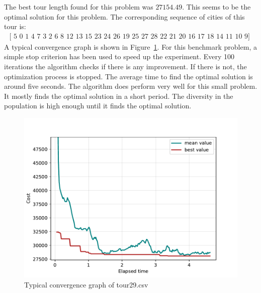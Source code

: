 \documentclass[a4paper,10pt]{article}
\begin{document}



The best tour length found for this problem was $27154.49$. This seems to be the optimal solution for this problem. The corresponding sequence of cities of this tour is: 
\begin{align*}
    \text{[ 5  0  1  4  7  3  2  6  8 12 13 15 23 24 26 19 25 27 28 22 21 20 16 17 18 14 11 10  9] }
\end{align*}
A typical convergence graph is shown in Figure~\ref{fig:convergence}. For this benchmark problem, a simple stop criterion has been used to speed up the experiment. Every 100 iterations the algorithm checks if there is any improvement. If there is not, the optimization process is stopped. The average time to find the optimal solution is around five seconds. The algorithm does perform very well for this small problem. It mostly finds the optimal solution in a short period. The diversity in the population is high enough until it finds the optimal solution. 
\begin{figure}[H]
    \centering
    \includegraphics[width=.8\linewidth]{img/convergence.pdf}
    \caption{Typical convergence graph of tour29.csv}
    \label{fig:convergence}
\end{figure}
\end{document}

